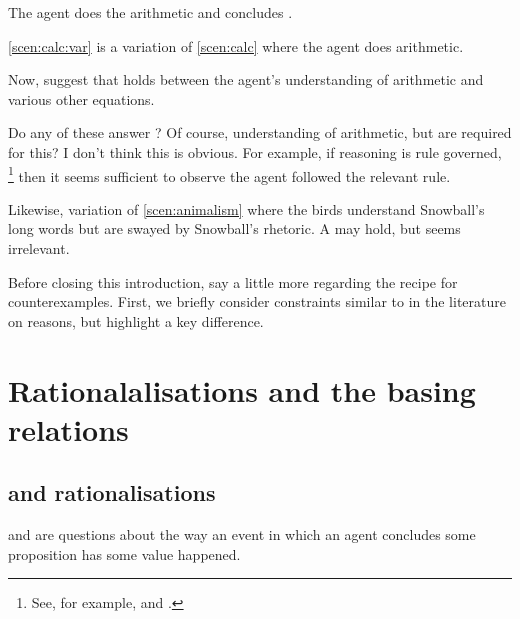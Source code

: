 \begin{note}
\begin{scenario}[Multiplication]
    The agent does the arithmetic and concludes \propM{\gistCalcEq{}}.
  \end{scenario}

  \noindent%
  \autoref{scen:calc:var} is a variation of \autoref{scen:calc} where the agent does arithmetic.

  Now, suggest that \ros{} holds between the agent's understanding of arithmetic and various other equations.

  Do any of these \ros{} answer \qWhy{}?
  Of course, understanding of arithmetic, but are \ros{} required for this?
  I don't think this is obvious.
  For example, if reasoning is rule governed,%
  \footnote{
    See, for example, \textcite{Boghossian:2008vf} and \textcite{Broome:2013aa}.
  }
  then it seems sufficient to observe the agent followed the relevant rule.


  Likewise, variation of \autoref{scen:animalism} where the birds understand Snowball's long words but are swayed by Snowball's rhetoric.
  A \ros{} may hold, but seems irrelevant.
\end{note}

\begin{note}
  Before closing this introduction, say a little more regarding the recipe for counterexamples.
  First, we briefly consider constraints similar to \issueInclusion{} in the literature on reasons, but highlight a key difference.
\end{note}

\section*{Rationalalisations and the basing relations}

\subsection*{\issueInclusion{} and rationalisations}
\label{sec:reasons}

\begin{note}
  \qWhy{} and \qHow{} are questions about the way an event in which an agent concludes some proposition has some value happened.
\end{note}

